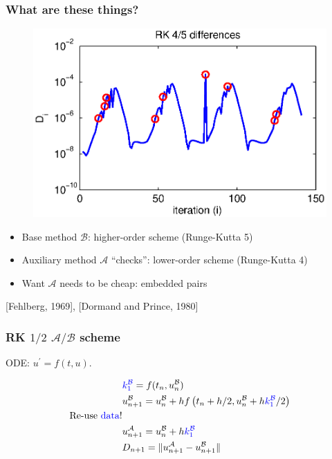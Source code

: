 \documentclass{beamer}
\newcommand{\A}{\mathcal{A}}
\newcommand{\B}{\mathcal{B}}
\begin{document}
%
\begin{frame}
\frametitle{What are these things?}

\begin{figure}
  \centering
  \includegraphics[scale=0.5]{figs/vdp2_rk.eps}
\end{figure}

\begin{itemize}
\setlength{\itemsep}{0.05in}
\item{Base method $\B$: higher-order scheme (Runge-Kutta 5)}
\pause
\item{Auxiliary method $\A$ ``checks'': lower-order scheme (Runge-Kutta 4)}
\pause
\item{Want $\A$ needs to be cheap: embedded pairs}
\end{itemize}

[Fehlberg, 1969],
[Dormand and Prince, 1980]

\end{frame}

\begin{frame}
\frametitle{RK $1/2$ $\A/\B$ scheme}

ODE: $u^{\prime} = f(t, u)$.

\begin{align}
& \textcolor{blue}{k_1^{\B}} = f(t_n, u_n^{\B}) \nonumber \\
& u^{\B}_{n+1} = u_n^{\B} + hf\left(t_n + h/2, u_n^{\B} + h\textcolor{blue}{k_1^{\B}}/2\right) \nonumber \\
\text{Re-use \textcolor{blue}{data}!} \nonumber \\
& u_{n+1}^{\A} = u_n^{\B} + h\textcolor{blue}{k_1^{\B}} \nonumber \\
& D_{n+1} = \| u_{n+1}^{\A} - u_{n+1}^{\B} \| \nonumber
\end{align}
\end{frame}
\end{document}
